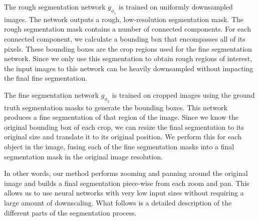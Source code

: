 The rough segmentation network $g_{\phi_1}$ is trained on uniformly downsampled images. The network outputs a rough, low-resolution segmentation mask. The rough segmentation mask contains a number of connected components. For each connected component, we calculate a bounding box that encompasses all of its pixels. These bounding boxes are the crop regions used for the fine segmentation network. Since we only use this segmentation to obtain rough regions of interest, the input images to this network can be heavily downsampled without impacting the final fine segmentation.

The fine segmentation network $g_{\phi_2}$ is trained on cropped images using the ground truth segmentation masks to generate the bounding boxes. This network produces a fine segmentation of that region of the image. Since we know the original bounding box of each crop, we can resize the final segmentation to its original size and translate it to its original position. We perform this for each object in the image, fusing each of the fine segmentation masks into a final segmentation mask in the original image resolution.

In other words, our method performs zooming and panning around the original image and builds a final segmentation piece-wise from each zoom and pan. This allows us to use neural networks with very low input sizes without requiring a large amount of downscaling. What follows is a detailed description of the different parts of the segmentation process.

